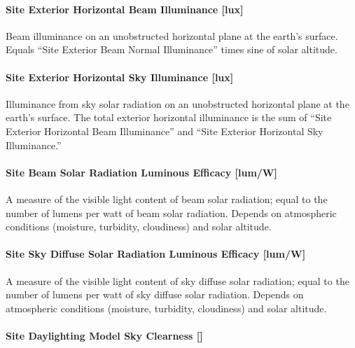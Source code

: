 \paragraph{Site Exterior Horizontal Beam Illuminance {[}lux{]}}\label{site-exterior-horizontal-beam-illuminance-lux}

Beam illuminance on an unobstructed horizontal plane at the earth's surface. Equals ``Site Exterior Beam Normal Illuminance'' times sine of solar altitude.

\paragraph{Site Exterior Horizontal Sky Illuminance {[}lux{]}}\label{site-exterior-horizontal-sky-illuminance-lux}

Illuminance from sky solar radiation on an unobstructed horizontal plane at the earth's surface. The total exterior horizontal illuminance is the sum of ``Site Exterior Horizontal Beam Illuminance'' and ``Site Exterior Horizontal Sky Illuminance.''

\paragraph{Site Beam Solar Radiation Luminous Efficacy {[}lum/W{]}}\label{site-beam-solar-radiation-luminous-efficacy-lumw}

A measure of the visible light content of beam solar radiation; equal to the number of lumens per watt of beam solar radiation. Depends on atmospheric conditions (moisture, turbidity, cloudiness) and solar altitude.

\paragraph{Site Sky Diffuse Solar Radiation Luminous Efficacy {[}lum/W{]}}\label{site-sky-diffuse-solar-radiation-luminous-efficacy-lumw}

A measure of the visible light content of sky diffuse solar radiation; equal to the number of lumens per watt of sky diffuse solar radiation. Depends on atmospheric conditions (moisture, turbidity, cloudiness) and solar altitude.

\paragraph{Site Daylighting Model Sky Clearness {[]}}\label{site-daylighting-model-sky-clearness}

